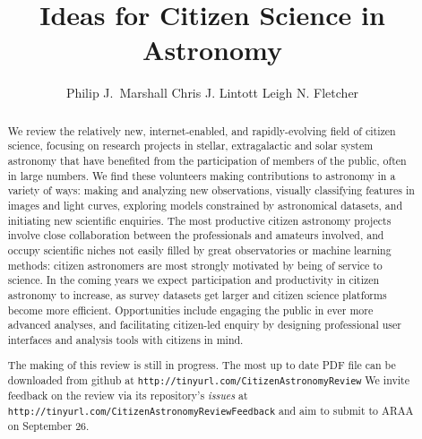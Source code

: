 \documentclass{ar2e}
\def\url#1{\texttt{#1}}
\begin{document}

\jvol{}
\ARinfo{}

\title{Ideas for Citizen Science in Astronomy}

\author{%
Philip J.\ Marshall
Chris J. Lintott
Leigh N. Fletcher
}




\begin{abstract} 

We review the relatively new, internet-enabled, and rapidly-evolving field of
citizen science, focusing on research projects in stellar, extragalactic and 
solar system astronomy that have benefited from the participation of members of
the public, often in large numbers. We find these volunteers making
contributions to astronomy in a variety of ways: making and analyzing new
observations, visually classifying features in images and light curves,
exploring models constrained by astronomical datasets, and initiating new
scientific enquiries.  The most productive citizen astronomy projects involve
close collaboration between the professionals and amateurs involved, and occupy
scientific niches not easily filled by great observatories or machine learning
methods: citizen astronomers are most strongly motivated by being of service to
science. In the coming years we expect participation and productivity in citizen
astronomy to increase, as survey datasets get larger and citizen science
platforms become more efficient. Opportunities include engaging the public in
ever more advanced analyses, and facilitating citizen-led enquiry by designing
professional user interfaces and analysis tools with citizens in mind.

\medskip The making of this review is still in progress. The most up to date PDF
file can be downloaded from github at 
\url{http://tinyurl.com/CitizenAstronomyReview} We invite feedback on the review
via its repository's {\it issues} at 
\url{http://tinyurl.com/CitizenAstronomyReviewFeedback} and aim to submit to
ARAA on September 26.

\end{abstract}
\end{document}
